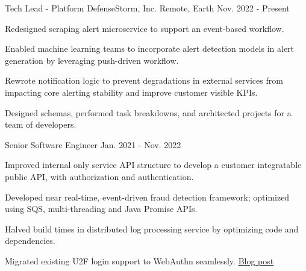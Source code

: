 
\begin{cventries}

    \cventry
    {Tech Lead - Platform}
    {DefenseStorm, Inc.}
    {Remote, Earth}
    {Nov. 2022 - Present}
    {
        \begin{cvitems}
            \item {Redesigned scraping alert microservice to support an event-based workflow.}
            \item {Enabled machine learning teams to incorporate alert detection models in alert generation by leveraging push-driven workflow.}
            \item {Rewrote notification logic to prevent degradations in external services from impacting core alerting stability and improve customer visible KPIs.}
            \item {Designed schemas, performed task breakdowns, and architected projects for a team of developers.}
        \end{cvitems}
    }

    \cventry
    {Senior Software Engineer}
    {} %
    {} %
    {Jan. 2021 - Nov. 2022}
    {
        \begin{cvitems}
            \item {Improved internal only service API structure to develop a customer integratable public API, with authorization and authentication.}
            \item {Developed near real-time, event-driven fraud detection framework; optimized using SQS, multi-threading and Java Promise APIs.}
            \item {Halved build times in distributed log processing service by optimizing code and dependencies.}
            \item {Migrated existing U2F login support to WebAuthn seamlessly. \href{https://www.jacobcasper.com/u2f2webauthn.html}{Blog post}}
        \end{cvitems}
    }


\end{cventries}
